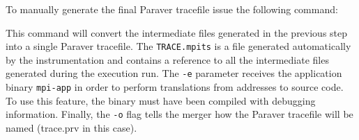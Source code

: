 To manually generate the final Paraver tracefile issue the following command:


This command will convert the intermediate files generated in the previous step into a single Paraver tracefile. The {\tt TRACE.mpits} is a file generated automatically by the instrumentation and contains a reference to all the intermediate files generated during the execution run. The {\tt -e} parameter receives the application binary {\tt mpi-app} in order to perform translations from addresses to source code. To use this feature, the binary must have been compiled with debugging information. Finally, the {\tt -o} flag tells the merger how the Paraver tracefile will be named (trace.prv in this case).


